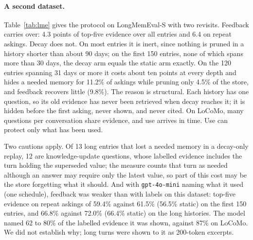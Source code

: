 \documentclass[11pt]{article}
\begin{document}
\paragraph{A second dataset.} Table~\ref{tab:lme} gives the protocol
on LongMemEval-S with two revisits. Feedback carries over: 4.3 points
of top-five evidence over all entries and 6.4 on repeat askings. Decay
does not. On most entries it is inert, since nothing is pruned in a
history shorter than about 90 days; on the first 150 entries, none of
which spans more than 30 days, the decay arm equals the static arm
exactly. On the 120 entries spanning 31 days or more it costs about
ten points at every depth and hides a needed memory for 11.2\% of
askings while pruning only 4.5\% of the store, and feedback recovers
little (9.8\%). The reason is structural. Each history has one
question, so its old evidence has never been retrieved when decay
reaches it; it is hidden before the first asking, never shown, and
never cited. On LoCoMo, many questions per conversation share
evidence, and use arrives in time. Use can protect only what has been
used.

Two cautions apply. Of 13 long entries that lost a needed memory in a
decay-only replay, 12 are knowledge-update questions, whose labelled
evidence includes the turn holding the superseded value; the measure
counts that turn as needed although an answer may require only the
latest value, so part of this cost may be the store forgetting what it
should. And with \texttt{gpt-4o-mini} naming what it used (one
schedule), feedback was weaker than with labels on this dataset:
top-five evidence on repeat askings of 59.4\% against 61.5\% (56.5\%
static) on the first 150 entries, and 66.8\% against 72.0\% (66.4\%
static) on the long histories. The model named 62 to 80\% of the
labelled evidence it was shown, against 87\% on LoCoMo. We did not
establish why; long turns were shown to it as 200-token excerpts.
\end{document}
